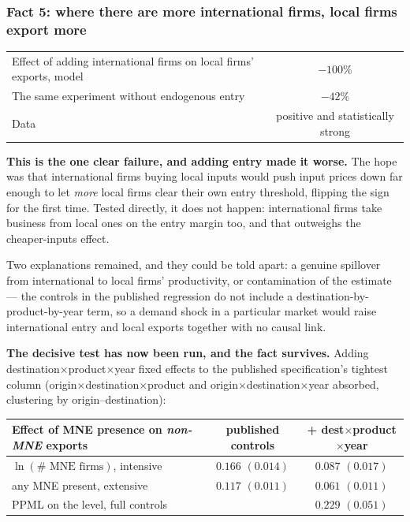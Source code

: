 \documentclass[11pt]{article}
\newenvironment{keypoint}
  {\begin{lrbox}{\kbox}\begin{minipage}{0.93\textwidth}\vspace{3pt}}
  {\vspace{3pt}\end{minipage}\end{lrbox}\begin{center}\fbox{\usebox{\kbox}}\end{center}}
\theoremstyle{plain}
\theoremstyle{remark}
\theoremstyle{definition}
\begin{document}
\subsubsection{Fact 5: where there are more international firms, local firms export more}
\label{sec:fact5}

\begin{center}
\begin{tabular}{lc}
\toprule
Effect of adding international firms on local firms' exports, model & $-100\%$\\
The same experiment without endogenous entry & $-42\%$\\
Data & positive and statistically strong\\
\bottomrule
\end{tabular}
\end{center}

\begin{keypoint}
\textbf{This is the one clear failure, and adding entry made it worse.} The hope was
that international firms buying local inputs would push input prices down far enough to
let \emph{more} local firms clear their own entry threshold, flipping the sign for the
first time. Tested directly, it does not happen: international firms take business from
local ones on the entry margin too, and that outweighs the cheaper-inputs effect.
\end{keypoint}

Two explanations remained, and they could be told apart: a genuine spillover from
international to local firms' productivity, or contamination of the estimate --- the
controls in the published regression do not include a destination-by-product-by-year
term, so a demand shock in a particular market would raise international entry and
local exports together with no causal link.

\medskip
\noindent\textbf{The decisive test has now been run, and the fact survives.} Adding
destination$\times$product$\times$year fixed effects to the published specification's
tightest column (origin$\times$destination$\times$product and
origin$\times$destination$\times$year absorbed, clustering by origin--destination):

\begin{center}
\begin{tabular}{lcc}
\toprule
Effect of MNE presence on \emph{non-MNE} exports & published controls & + dest$\times$product$\times$year\\
\midrule
$\ln(\#\text{ MNE firms})$, intensive & $0.166$ $(0.014)$ & $\mathbf{0.087}$ $(0.017)$\\
any MNE present, extensive & $0.117$ $(0.011)$ & $\mathbf{0.061}$ $(0.011)$\\
PPML on the level, full controls & & $0.229$ $(0.051)$\\
\bottomrule
\end{tabular}
\end{center}
\end{document}
